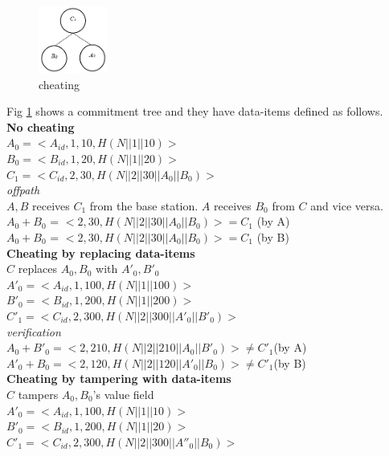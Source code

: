 \begin{exmp}
	\begin{figure}[t]
		\label{fig:cheating}
		\centering
			\includegraphics[width=0.2\textwidth]{images/commitment-tree-2.png}
			\caption{cheating}
	\end{figure}	
	Fig \ref{fig:cheating} shows a commitment tree and they have data-items defined as follows.\\
	\textbf{No cheating}\\
	$A_{0} = <A_{id},1,10, H(N||1||10)>$\\
	$B_{0} = <B_{id},1,20, H(N||1||20)>$\\
	$C_{1} = <C_{id},2,30, H(N||2||30||A_{0}||B_{0})>$\\
	\textit{offpath}\\
	$A,B$ receives $C_{1}$ from the base station.
	$A$ receives $B_{0}$ from $C$ and vice versa.\\
	$A_{0} + B_{0}$ = $<2,30,H(N||2||30||A_{0}||B_{0})> = C_{1}$ (by A)\\
	$A_{0} + B_{0}$ = $<2,30,H(N||2||30||A_{0}||B_{0})> = C_{1}$ (by B)\\
	\textbf{Cheating by replacing data-items}\\
		$C$ replaces $A_{0},B_{0}$ with $A'_{0},B'_{0}$\\
		$A'_{0} = <A_{id},1,100, H(N||1||100)>$\\
		$B'_{0} = <B_{id},1,200, H(N||1||200)>$\\
		$C'_{1} = <C_{id},2,300, H(N||2||300||A'_{0}||B'_{0})>$\\
		\textit{verification}\\
		$A_{0}+B'_{0} = <2,210,H(N||2||210||A_{0}||B'_{0})> \neq C'_{1}$(by A)\\
		$A'_{0}+B_{0} = <2,120,H(N||2||120||A'_{0}||B_{0})> \neq C'_{1}$(by B)\\
	\textbf{Cheating by tampering with data-items}\\
		$C$ tampers $A_{0},B_{0}$'s value field\\
		$A'_{0} = <A_{id},1,100, H(N||1||10)>$\\
		$B'_{0} = <B_{id},1,200, H(N||1||20)>$\\
		$C'_{1} = <C_{id},2,300, H(N||2||300||A''_{0}||B_{0})>$\\

\end{exmp}

